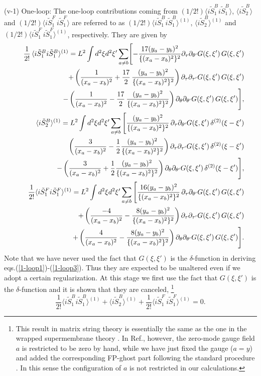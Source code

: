 \documentclass[a4paper,12pt]{article}
\newcommand{\nn}{\nonumber\\}
\newcommand{\ptau}{\partial_\tau}
\newcommand{\pth}{\partial_\theta}
\newcommand{\ptaup}{\partial_{\tau'}}
\newcommand{\pthp}{\partial_{\theta'}}
\newcommand{\vev}[1]{\langle #1 \rangle}
\begin{document}
(v-1) One-loop:
The one-loop contributions coming from
$(1/2!)\vev{i\tilde{S}_{1}^B  i\tilde{S}_{1}^B}$,
$\vev{i\tilde{S}_{2}^B}$ and
$(1/2!)\vev{i\tilde{S}_{1}^F \,i\tilde{S}_{1}^F}$
are referred to as
$(1/2!)\vev{i\tilde{S}_{1}^B  i\tilde{S}_{1}^B}^{(1)}$,
$\vev{i\tilde{S}_{2}^B}^{(1)}$ and
$(1/2!)\vev{i\tilde{S}_{1}^F \,i\tilde{S}_{1}^F}^{(1)}$,
respectively. They are given by
\begin{eqnarray}
  &&\frac{1}{2!}\,\vev{i\tilde{S}_{1}^B
	i\tilde{S}_{1}^B}^{(1)}=L^2\int d^2 \xi d^2 \xi'
	\sum_{a\ne b}\Biggl[-\frac{17(y_a-y_b)^2}{\{(x_a-x_b)^2\}^2}
	\ptau\pthp G(\xi,\xi')\,G(\xi,\xi')\nn
  &&\hspace{6ex} +\left(
	\frac{1}{(x_a-x_b)^2}+\frac{17}{2}\,\frac{(y_a-y_b)^2}
	{\{(x_a-x_b)^2\}^2}\right)
	\ptau\ptaup G(\xi,\xi')\,G(\xi,\xi')\nn
  &&\hspace{6ex}-\left(
	\frac{1}{(x_a-x_b)^2}-\frac{17}{2}\,
	\frac{(y_a-y_b)^2}{\{(x_a-x_b)^2\}^2}\right)
	\pth\pthp G(\xi,\xi')\,G(\xi,\xi')\Biggr],\label{1-loop1}\\
  &&\vev{i\tilde{S}_{2}^B}^{(1)}= L^2\int d^2 \xi d^2
	\xi'\sum_{a\ne b}\Bigg[\frac{(y_a-y_b)^2}{\{(x_a-x_b)^2\}^2}\,
	\ptau \pthp G(\xi,\xi')\,\delta^{(2)}(\xi-\xi')\nn
  &&\hspace{6ex}\left(\frac{3}{(x_a-x_b)^2}
	-\frac{1}{2}\frac{(y_a-y_b)^2}{\{(x_a-x_b)^2\}^2}\right)
	\ptau \ptaup G(\xi,\xi')\,\delta^{(2)}(\xi-\xi')\nn
  &&\hspace{6ex}
	-\left(\frac{3}{(x_a-x_b)^2}
	+\frac{1}{2}\frac{(y_a-y_b)^2}{\{(x_a-x_b)^2\}^2}\right)
	\pth\pthp G(\xi,\xi')\,\delta^{(2)}(\xi-\xi')\Bigg],
	\label{1-loop2}\\
  &&\frac{1}{2!}\vev{i\tilde{S}_{1}^F
	i\tilde{S}_{1}^F}^{(1)} =L^2\int d^2 \xi d^2 \xi'
	\sum_{a \ne b}\Bigg[\frac{16(y_a-y_b)^2}{\{(x_a-x_b)^2\}^2}\,
	\ptau \pthp G(\xi,\xi')\,G(\xi,\xi')\nn
  &&\hspace{6ex}+\left(\frac{-4}{(x_a-x_b)^2}
	-\frac{8(y_a-y_b)^2}{\{(x_a-x_b)^2\}^2}\right)
	\ptau \ptaup G(\xi,\xi')\,G(\xi,\xi')\nn
  &&\hspace{6ex}+\left(\frac{4}{(x_a-x_b)^2}
	-\frac{8(y_a-y_b)^2}{\{(x_a-x_b)^2\}^2}\right)
	\pth \pthp G(\xi,\xi')\,G(\xi,\xi')\Bigg]\label{1-loop3}.
\end{eqnarray}
Note that we have never used the fact that $G(\xi,\xi')$ is the
$\delta$-function in deriving eqs.(\ref{1-loop1})-(\ref{1-loop3}).
Thus they are expected to be unaltered even if we adopt a certain
regularization.
At this stage we first use the fact that $G(\xi,\xi')$ is the
$\delta$-function and it is shown that they are canceled,
\footnote{This result in matrix string theory is essentially
the same as the one in the wrapped supermembrane theory \cite{SY}.
In Ref.\cite{SY}, however, the zero-mode gauge field $a$ is restricted
to be zero by hand, while we have just fixed the gauge ($a=y$) and
added the corresponding FP-ghost part following the standard procedure
\cite{KU}. In this sense the configuration of $a$ is not restricted in
our calculations.}
\begin{equation}
 \frac{1}{2!}\vev{i\tilde{S}_{1}^B  i\tilde{S}_{1}^B}^{(1)}
  +\vev{i\tilde{S}_{2}^B}^{(1)}
  + \frac{1}{2!}\vev{i\tilde{S}_{1}^F\,i\tilde{S}_{1}^F}^{(1)}=0.
\end{equation}
\end{document}
